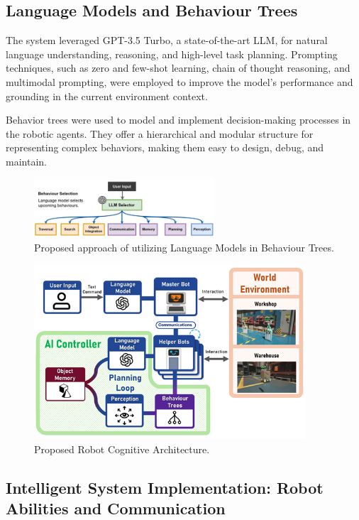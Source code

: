 \documentclass[pdflatex,sn-mathphys-num]{sn-jnl}%
\theoremstyle{thmstyleone}%
\theoremstyle{thmstyletwo}%
\theoremstyle{thmstylethree}%
\begin{document}
\subsection{Language Models and Behaviour Trees}
The system leveraged GPT-3.5 Turbo, a state-of-the-art LLM, for natural language understanding, reasoning, and high-level task planning. Prompting techniques, such as zero and few-shot learning, chain of thought reasoning, and multimodal prompting, were employed to improve the model's performance and grounding in the current environment context.

Behavior trees were used to model and implement decision-making processes in the robotic agents. They offer a hierarchical and modular structure for representing complex behaviors, making them easy to design, debug, and maintain.


\begin{figure}[h]
\centering
\includegraphics[width=0.6\textwidth]{figures/Picture12.png}
\caption{Proposed approach of utilizing Language Models in Behaviour Trees.}\label{fig7}
\end{figure}

\begin{figure}[h]
\centering
\includegraphics[width=0.9\textwidth]{figures/Picture5.png}
\caption{Proposed Robot Cognitive Architecture.}\label{fig8}
\end{figure}
\subsection{Intelligent System Implementation: Robot Abilities and Communication}
\end{document}
